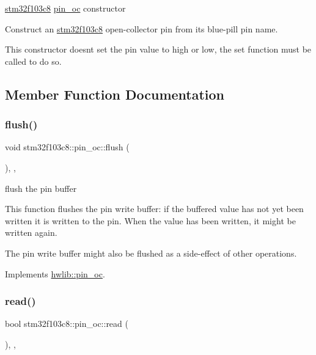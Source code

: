 \hyperlink{namespacestm32f103c8}{stm32f103c8} \hyperlink{classstm32f103c8_1_1pin__oc}{pin\+\_\+oc} constructor

Construct an \hyperlink{namespacestm32f103c8}{stm32f103c8} open-\/collector pin from its blue-\/pill pin name.

This constructor doesn\textquotesingle{}t set the pin value to high or low, the set function must be called to do so. 

\subsection{Member Function Documentation}
\mbox{\label{classstm32f103c8_1_1pin__oc_ac86dbc1c7430d2dbdee190ee87b2e35e}} 
\subsubsection{\texorpdfstring{flush()}{flush()}}
{\footnotesize\ttfamily void stm32f103c8\+::pin\+\_\+oc\+::flush (\begin{DoxyParamCaption}{ }\end{DoxyParamCaption})\hspace{0.3cm}{\ttfamily [inline]}, {\ttfamily [override]}, {\ttfamily [virtual]}}





flush the pin buffer

This function flushes the pin write buffer\+: if the buffered value has not yet been written it is written to the pin. When the value has been written, it might be written again.

The pin write buffer might also be flushed as a side-\/effect of other operations. 

Implements \hyperlink{classhwlib_1_1pin__oc_a021036a4566c712e43250ddd28a85e54}{hwlib\+::pin\+\_\+oc}.

\mbox{\label{classstm32f103c8_1_1pin__oc_ae733a459b1f10ca38ac20f2d60923833}} 
\subsubsection{\texorpdfstring{read()}{read()}}
{\footnotesize\ttfamily bool stm32f103c8\+::pin\+\_\+oc\+::read (\begin{DoxyParamCaption}{ }\end{DoxyParamCaption})\hspace{0.3cm}{\ttfamily [inline]}, {\ttfamily [override]}, {\ttfamily [virtual]}}





